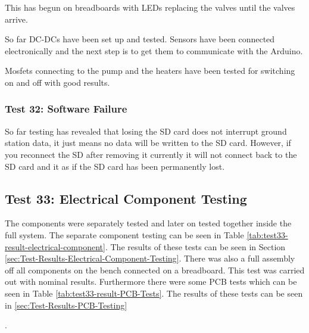 This has begun on breadboards with LEDs replacing the valves until the valves arrive. 

So far DC-DCs have been set up and tested. Sensors have been connected electronically and the next step is to get them to communicate with the Arduino.

Mosfets connecting to the pump and the heaters have been tested for switching on and off with good results.

\subsubsection{Test 32: Software Failure}

So far testing has revealed that losing the SD card does not interrupt ground station data, it just means no data will be written to the SD card. However, if you reconnect the SD after removing it currently it will not connect back to the SD card and it as if the SD card has been permanently lost.

\pagebreak
\subsection{Test 33: Electrical Component Testing}
\label{sec:test33result}
The components were separately tested and later on tested together inside the full system. The separate component testing can be seen in Table \ref{tab:test33-result-electrical-component}. The results of these tests can be seen in Section \ref{sec:Test-Results-Electrical-Component-Testing}. There was also a full assembly off all components on the bench connected on a breadboard. This test was carried out with nominal results. Furthermore there were some PCB tests which can be seen in Table \ref{tab:test33-result-PCB-Tests}. The results of these tests can be seen in \ref{sec:Test-Results-PCB-Testing}

.




